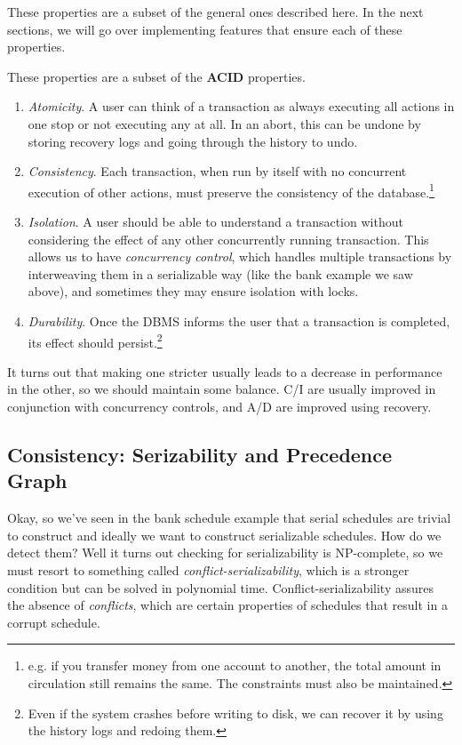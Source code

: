   These properties are a subset of the general ones described here. In the next sections, we will go over implementing features that ensure each of these properties. 

  \begin{definition}[ACID]
    \label{def:acid}
    These properties are a subset of the \textbf{ACID} properties.
    \begin{enumerate}
      \item \textit{Atomicity}. A user can think of a transaction as always executing all actions in one stop or not executing any at all. In an abort, this can be undone by storing recovery logs and going through the history to undo. 
      \item \textit{Consistency}. Each transaction, when run by itself with no concurrent execution of other actions, must preserve the consistency of the database.\footnote{e.g. if you transfer money from one account to another, the total amount in circulation still remains the same. The constraints must also be maintained. } 
      \item \textit{Isolation}. A user should be able to understand a transaction without considering the effect of any other concurrently running transaction. This allows us to have \textit{concurrency control}, which handles multiple transactions by interweaving them in a serializable way (like the bank example we saw above), and sometimes they may ensure isolation with locks.  

      \item \textit{Durability}. Once the DBMS informs the user that a transaction is completed, its effect should persist.\footnote{Even if the system crashes before writing to disk, we can recover it by using the history logs and redoing them.}
    \end{enumerate}

    It turns out that making one stricter usually leads to a decrease in performance in the other, so we should maintain some balance. C/I are usually improved in conjunction with concurrency controls, and A/D are improved using recovery. 
  \end{definition}

\subsection{Consistency: Serizability and Precedence Graph}

  Okay, so we've seen in the bank schedule example that serial schedules are trivial to construct and ideally we want to construct serializable schedules. How do we detect them? Well it turns out checking for serializability is NP-complete, so we must resort to something called \textit{conflict-serializability}, which is a stronger condition but can be solved in polynomial time. Conflict-serializability assures the absence of \textit{conflicts}, which are certain properties of schedules that result in a corrupt schedule.   


